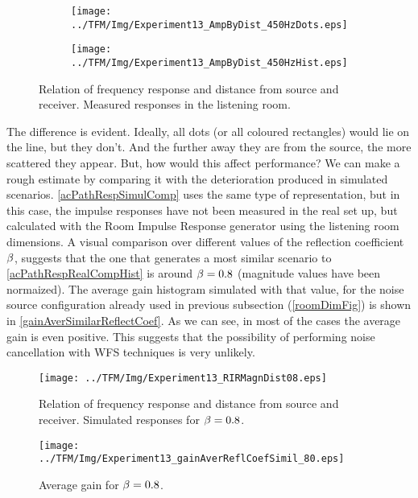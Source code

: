 \begin{figure}[h]
	\centering
	\begin{subfigure}[b]{0.45\textwidth}
		\centering
		\texttt{[image: ../TFM/Img/Experiment13\_AmpByDist\_450HzDots.eps]}
		\caption{}
		\label{acPathRespRealCompDots}
	\end{subfigure}
	\begin{subfigure}[b]{0.45\textwidth}
		\centering
		\texttt{[image: ../TFM/Img/Experiment13\_AmpByDist\_450HzHist.eps]}
		\caption{}
		\label{acPathRespRealCompHist}
	\end{subfigure}
	\caption{Relation of frequency response and distance from source and receiver. Measured responses in the listening room.}
	\label{acPathRespRealComp}
\end{figure}

The difference is evident. Ideally, all dots (or all coloured rectangles) would lie on the line, but they don't. And the further away they are from the source, the more scattered they appear. But, how would this affect performance? We can make a rough estimate by comparing it with the deterioration produced in simulated scenarios. \autoref{acPathRespSimulComp} uses the same type of representation, but in this case, the impulse responses have not been measured in the real set up, but calculated with the Room Impulse Response generator using the listening room dimensions. A visual comparison over different values of the reflection coefficient $\beta$, suggests that the one that generates a most similar scenario to \autoref{acPathRespRealCompHist} is around $\beta = 0.8$ (magnitude values have been normaized). The average gain histogram simulated with that value, for the noise source configuration already used in previous subsection (\autoref{roomDimFig}) is shown in \autoref{gainAverSimilarReflectCoef}. As we can see, in most of the cases the average gain is even positive. This suggests that the possibility of performing noise cancellation with WFS techniques is very unlikely.

\begin{figure}[h]
	\centering
	\texttt{[image: ../TFM/Img/Experiment13\_RIRMagnDist08.eps]}
	\caption{Relation of frequency response and distance from source and receiver. Simulated responses for $\beta = 0.8$.}
	\label{acPathRespSimulComp}
\end{figure}

\begin{figure}[h]
	\centering
	\texttt{[image: ../TFM/Img/Experiment13\_gainAverReflCoefSimil\_80.eps]}
	\caption{Average gain for $\beta = 0.8$.}
	\label{gainAverSimilarReflectCoef}
\end{figure}

